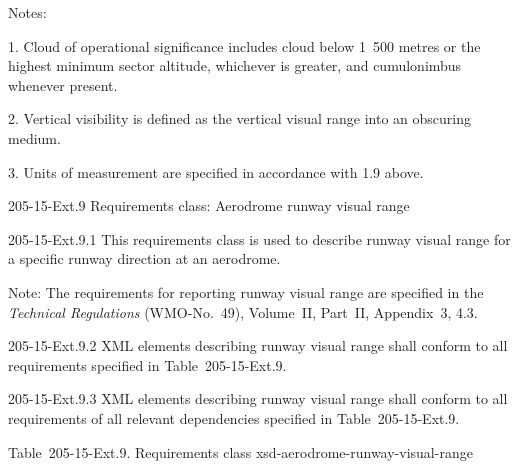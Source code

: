 Notes:

1. Cloud of operational significance includes cloud below 1~500 metres or the highest minimum sector altitude, whichever is greater, and cumulonimbus whenever present.

2. Vertical visibility is defined as the vertical visual range into an obscuring medium.

3. Units of measurement are specified in accordance with 1.9 above.

205-15-Ext.9 Requirements class: Aerodrome runway visual range

205-15-Ext.9.1 This requirements class is used to describe runway visual range for a specific runway direction at an aerodrome.

Note: The requirements for reporting runway visual range are specified in the \emph{Technical Regulations} (WMO-No.~49), Volume~II, Part~II, Appendix~3, 4.3.

205-15-Ext.9.2 XML elements describing runway visual range shall conform to all requirements specified in Table~205-15-Ext.9.

205-15-Ext.9.3 XML elements describing runway visual range shall conform to all requirements of all relevant dependencies specified in Table~205-15-Ext.9.

Table~205-15-Ext.9. Requirements class xsd-aerodrome-runway-visual-range

